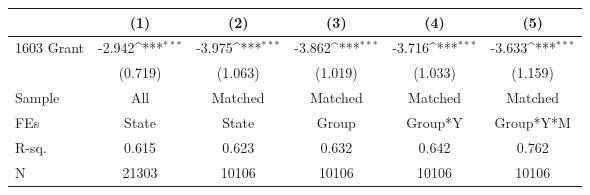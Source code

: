{
\def\sym#1{\ifmmode^{#1}\else\(^{#1}\)\fi}
\begin{tabular}{l*{5}{c}}
\toprule
                    &\multicolumn{1}{c}{(1)}         &\multicolumn{1}{c}{(2)}         &\multicolumn{1}{c}{(3)}         &\multicolumn{1}{c}{(4)}         &\multicolumn{1}{c}{(5)}         \\
\midrule
1603 Grant          &      -2.942\sym{***}&      -3.975\sym{***}&      -3.862\sym{***}&      -3.716\sym{***}&      -3.633\sym{***}\\
                    &     (0.719)         &     (1.063)         &     (1.019)         &     (1.033)         &     (1.159)         \\
\midrule
Sample              &         All         &     Matched         &     Matched         &     Matched         &     Matched         \\
FEs                 &       State         &       State         &       Group         &     Group*Y         &   Group*Y*M         \\
R-sq.               &       0.615         &       0.623         &       0.632         &       0.642         &       0.762         \\
N                   &       21303         &       10106         &       10106         &       10106         &       10106         \\
\bottomrule
\end{tabular}
}
